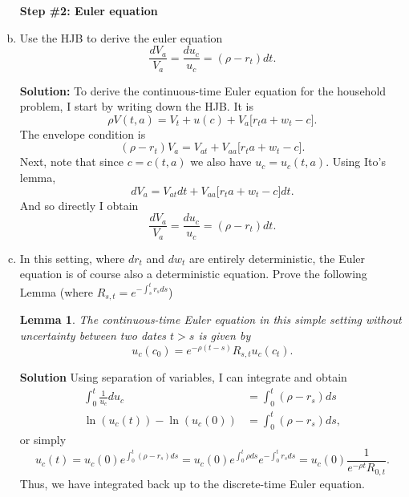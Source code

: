 \documentclass[11pt]{extarticle}
\theoremstyle{plain}
\newtheorem{lem}[thm]{Lemma}
\theoremstyle{definition}
\begin{document}
\begin{enumerate}[(a)]
\vspace{5mm}
\noindent
\textbf{Step \#2: Euler equation }



\item Use the HJB to derive the euler equation
\begin{equation*}
	\frac{dV_a}{V_a} = \frac{du_c}{u_c} =  (\rho - r_t) dt. 
\end{equation*}

\textbf{Solution:} 
\vspace{3mm}
\noindent
To derive the continuous-time Euler equation for the household problem, I start by writing down the HJB. It is 
\begin{equation*}
	\rho V(t,a) = V_t + u(c) + V_a \Big[ r_t a + w_t - c \Big]. 
\end{equation*}
The envelope condition is 
\begin{equation*}
	(\rho - r_t) V_a = V_{at} +  V_{aa} \Big[ r_t a + w_t - c \Big] .
\end{equation*}
Next, note that since $c = c(t,a)$ we also have $u_c = u_c(t,a)$. Using Ito's lemma, 
\begin{equation*}
	dV_a = V_{at} dt + V_{aa} \Big[ r_t a + w_t - c \Big] dt. 
\end{equation*}
And so directly I obtain 
\begin{equation*}
	\frac{dV_a}{V_a} = \frac{du_c}{u_c} =  (\rho - r_t) dt. 
\end{equation*}


\item In this setting, where $dr_t$ and $dw_t$ are entirely deterministic, the Euler equation is of course also a deterministic equation. Prove the following Lemma (where $R_{s,t}=e^{-\int_s^t r_s ds}$)
\begin{lem} 
	
	The continuous-time Euler equation in this simple setting without uncertainty between two dates $t > s$ is given by
	\begin{equation*}
		u_c(c_0) = e^{- \rho (t-s)} R_{s,t} u_c(c_t). 
	\end{equation*}
\end{lem}

\textbf{Solution}
Using separation of variables, I can integrate and obtain 
\begin{align*}
	\int_0^t \frac{1}{u_c} du_c &=  \int_0^t (\rho - r_s) ds \\
	\ln(u_c(t)) - \ln(u_c(0)) &=  \int_0^t (\rho - r_s) ds,
\end{align*}
or simply 
\begin{equation*}
	u_c(t) = u_c(0) e^{\int_0^t (\rho - r_s) ds} = u_c(0) e^{\int_0^t \rho ds} e^{- \int_0^t r_s ds} = u_c(0) \frac{1 }{e^{-\rho t}R_{0,t}}.
\end{equation*}
Thus, we have integrated back up to the discrete-time Euler equation. 



\end{enumerate}
\end{document}
